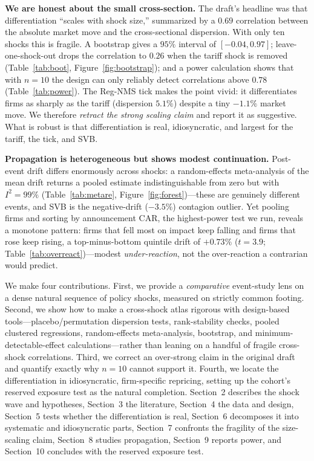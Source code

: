 \documentclass[12pt]{article}
\begin{document}
\textbf{We are honest about the small cross-section.} The draft's headline was that differentiation
``scales with shock size,'' summarized by a $0.69$ correlation between the absolute market move and
the cross-sectional dispersion. With only ten shocks this is fragile. A bootstrap gives a $95\%$
interval of $[-0.04,0.97]$; leave-one-shock-out drops the correlation to $0.26$ when the tariff
shock is removed (Table~\ref{tab:boot}, Figure~\ref{fig:bootstrap}); and a power calculation shows
that with $n=10$ the design can only reliably detect correlations above $0.78$
(Table~\ref{tab:power}). The Reg-NMS tick makes the point vivid: it differentiates firms as sharply
as the tariff (dispersion $5.1\%$) despite a tiny $-1.1\%$ market move. We therefore \emph{retract
the strong scaling claim} and report it as suggestive. What is robust is that differentiation is
real, idiosyncratic, and largest for the tariff, the tick, and SVB.

\textbf{Propagation is heterogeneous but shows modest continuation.} Post-event drift differs
enormously across shocks: a random-effects meta-analysis \citep{dersimonian1986,higgins2002} of
the mean drift returns a pooled estimate indistinguishable from zero but with $I^2=99\%$
(Table~\ref{tab:metare}, Figure~\ref{fig:forest})---these are genuinely different events, and SVB is
the negative-drift ($-3.5\%$) contagion outlier. Yet pooling firms and sorting by announcement CAR,
the highest-power test we run, reveals a monotone pattern: firms that fell most on impact keep
falling and firms that rose keep rising, a top-minus-bottom quintile drift of $+0.73\%$ ($t=3.9$;
Table~\ref{tab:overreact})---modest \emph{under-reaction}, not the over-reaction a contrarian would
predict.

We make four contributions. First, we provide a \emph{comparative} event-study lens on a dense
natural sequence of policy shocks, measured on strictly common footing. Second, we show how to make
a cross-shock atlas rigorous with design-based tools---placebo/permutation dispersion tests,
rank-stability checks, pooled clustered regressions, random-effects meta-analysis, bootstrap, and
minimum-detectable-effect calculations---rather than leaning on a handful of fragile cross-shock
correlations. Third, we correct an over-strong claim in the original draft and quantify exactly why
$n=10$ cannot support it. Fourth, we locate the differentiation in idiosyncratic, firm-specific
repricing, setting up the cohort's reserved exposure test as the natural completion. Section~2
describes the shock wave and hypotheses, Section~3 the literature, Section~4 the data and design,
Section~5 tests whether the differentiation is real, Section~6 decomposes it into systematic and
idiosyncratic parts, Section~7 confronts the fragility of the size-scaling claim, Section~8 studies
propagation, Section~9 reports power, and Section~10 concludes with the reserved exposure test.
\end{document}
